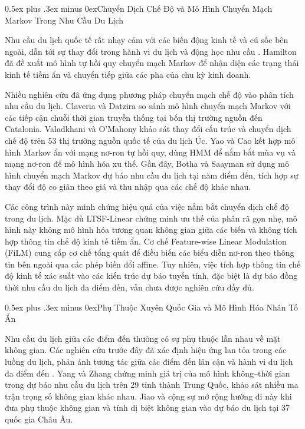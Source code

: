 \documentclass[10pt,journal,compsoc]{IEEEtran}
\makeatletter
\def\subsection{\@startsection{subsection}{2}{\z@}{-1.8ex plus -0.6ex minus -0.3ex}%
{0.5ex plus .3ex minus 0ex}{\normalfont\normalsize\rmfamily\bfseries}}
\makeatother
\begin{document}
\subsection{Chuyển Dịch Chế Độ và Mô Hình Chuyển Mạch Markov Trong Nhu Cầu Du Lịch}

Nhu cầu du lịch quốc tế rất nhạy cảm với các biến động kinh tế và cú sốc bên ngoài, dẫn tới sự thay đổi trong hành vi du lịch và động học nhu cầu \cite{gossling2020pandemics}. Hamilton \cite{hamilton1989regime} đã đề xuất mô hình tự hồi quy chuyển mạch Markov để nhận diện các trạng thái kinh tế tiềm ẩn và chuyển tiếp giữa các pha của chu kỳ kinh doanh.

Nhiều nghiên cứu đã ứng dụng phương pháp chuyển mạch chế độ vào phân tích nhu cầu du lịch. Claveria và Datzira \cite{claveria2010forecasting} so sánh mô hình chuyển mạch Markov với các tiếp cận chuỗi thời gian truyền thống tại bốn thị trường nguồn đến Catalonia. Valadkhani và O'Mahony \cite{valadkhani2018identifying} khảo sát thay đổi cấu trúc và chuyển dịch chế độ trên 53 thị trường nguồn quốc tế của du lịch Úc. Yao và Cao \cite{yao2020neural} kết hợp mô hình Markov ẩn với mạng nơ-ron tự hồi quy, dùng HMM để nắm bắt mùa vụ và mạng nơ-ron để mô hình hóa xu thế. Gần đây, Botha và Saayman \cite{botha2022forecasting} sử dụng mô hình chuyển mạch Markov dự báo nhu cầu du lịch tại năm điểm đến, tích hợp sự thay đổi độ co giãn theo giá và thu nhập qua các chế độ khác nhau.

Các công trình này minh chứng hiệu quả của việc nắm bắt chuyển dịch chế độ trong du lịch. Mặc dù LTSF-Linear \cite{zeng2023dlinear} chứng minh ưu thế của phân rã gọn nhẹ, mô hình này không mô hình hóa tương quan không gian giữa các biến và không tích hợp thông tin chế độ kinh tế tiềm ẩn. Cơ chế Feature-wise Linear Modulation (FiLM) \cite{perez2018film} cung cấp cơ chế tổng quát để điều biến các biểu diễn nơ-ron theo thông tin bên ngoài qua các phép biến đổi affine. Tuy nhiên, việc tích hợp thông tin chế độ kinh tế xác suất vào các kiến trúc dự báo tuyến tính, đặc biệt là dự báo đồng thời nhu cầu du lịch đa điểm đến, vẫn chưa được nghiên cứu đầy đủ.

\subsection{Phụ Thuộc Xuyên Quốc Gia và Mô Hình Hóa Nhân Tố Ẩn}

Nhu cầu du lịch giữa các điểm đến thường có sự phụ thuộc lẫn nhau về mặt không gian. Các nghiên cứu trước đây đã xác định hiệu ứng lan tỏa trong các luồng du lịch, phản ánh tương tác giữa các điểm đến lân cận và hành vi du lịch đa điểm đến \cite{yang2012spatial}. Yang và Zhang \cite{yang2019spatiotemporal} chứng minh giá trị của mô hình không--thời gian trong dự báo nhu cầu du lịch trên 29 tỉnh thành Trung Quốc, khảo sát nhiều ma trận trọng số không gian khác nhau. Jiao và cộng sự \cite{jiao2020local} mở rộng hướng đi này khi đưa phụ thuộc không gian và tính dị biệt không gian vào dự báo du lịch tại 37 quốc gia Châu Âu.
\end{document}
